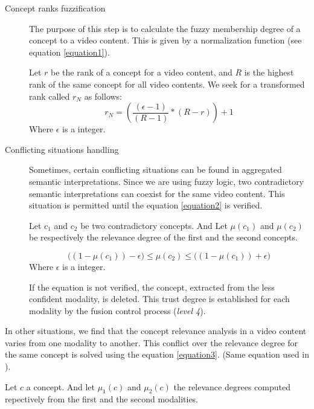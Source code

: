 		\begin{description}
			\item[Concept ranks fuzzification]
			The purpose of this step is to calculate the fuzzy membership
			degree of a concept to a video content. 
			This is given by a normalization function (see equation \ref{equation1}).

			Let $r$ be the rank of a concept for a video content, and $R$ is the highest 
			rank of the same concept for all video contents. We seek for a transformed rank called $r_{N}$ as follows:
			\begin{equation}
				\label{equation1}
				r_{N} = \left( \frac{(\epsilon -1)}{(R-1)} * (R-r) \right) +1 
			\end{equation}
			Where $\epsilon$ is a  integer.

			\item[Conflicting situations handling]
		Sometimes, certain conflicting situations can be found in aggregated semantic interpretations.
		Since we are using fuzzy logic, two contradictory semantic interpretations can coexist for the 
		same video content. This situation is  permitted until the equation \ref{equation2} is verified.
		
		Let $c_{1}$ and $c_{2}$ be two contradictory concepts. And Let $\mu(c_{1})$ and $\mu(c_{2})$
		be respectively the relevance degree of the first and the second concepts. 

		\begin{equation}
			\label{equation2}
				\Big((1 - \mu(c_{1})) - \epsilon \Big)   \leq   \mu(c_{2})   \leq    
				\Big( (1 - \mu(c_{1})) + \epsilon \Big) 
		\end{equation}
		Where $\epsilon$ is a  integer.
		
		If the equation is not verified, the concept, extracted from the less 
		confident modality, is deleted. This trust degree is established for each modality by the fusion 
		control process (\emph{level 4}).

		\end{description}

		In other situations, we find that the concept relevance analysis in a video content varies from one 
		modality to another. This conflict over the relevance degree for the same concept is solved using the equation 
		\ref {equation3}. (Same equation used in \citep{Vrochidis2010}).

		Let $c$ a concept. And let $\mu_{1}(c)$ and $\mu_{2}(c)$  the relevance degrees computed repectively from the 
		first and the second modalities.

